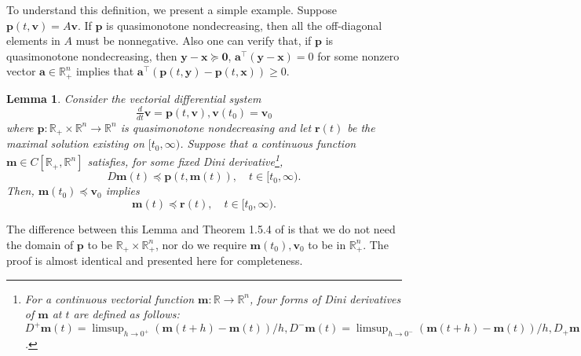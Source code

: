 \documentclass[letterpaper, 10 pt, journal, twoside]{IEEEtran}
\theoremstyle{plain}
\newtheorem{lemma}{Lemma}
\newcommand{\myvar}[1]{\bm{#1}}
\begin{document}
To {understand} this definition, we present a simple example. {Suppose} $ \myvar{p}(t, \myvar{v}) = A\myvar{v} $. {If} $ \myvar{p} $ {is} quasimonotone nondecreasing, {then} all the off-diagonal elements in $ A $ {must be} nonnegative. {Also} one {can} verify that, if $ \myvar{p} $ is quasimonotone nondecreasing, then  $ \myvar{y} - \myvar{x} \succeq \myvar{0}$, $ \myvar{a}^\top (\myvar{y}-\myvar{x}) = 0 $ for some nonzero vector $ \myvar{a} \in \mathbb{R}^n_{+} $ implies that $ \myvar{a}^\top (\myvar{p}(t,\myvar{y})- \myvar{p}(t,\myvar{x})) \ge 0 $.

\begin{lemma}\cite[Modified from Theorem~1.5.4]{lakshmikantham1989stability} \label{lem:generalized comparison lemma}
	Consider the vectorial differential system 
	\begin{equation}\label{eq:general_sys}
	\tfrac{d}{dt}\myvar{v} = \myvar{p}(t,\myvar{v}), \myvar{v}(t_0) = \myvar{v}_0
	\end{equation}
	where $ \myvar{p}: \mathbb{R}_{+}  \times \mathbb{R}^n \to \mathbb{R}^n $ is quasimonotone nondecreasing and let $ \myvar{r}(t) $ be the maximal solution existing on $ [t_0, \infty) $. Suppose that a continuous function $ \myvar{m}\in C[\mathbb{R}_{+}, \mathbb{R}^n] $ satisfies, for some fixed Dini derivative\footnote{ For a continuous vectorial function $\myvar{m}:\mathbb{R}\to \mathbb{R}^n$, four forms of Dini derivatives of $\myvar{m}$ at $t$  are defined as follows: $D^{+}\myvar{m}(t) = \limsup_{h \to 0^{+}} ( \myvar{m}(t+h) - \myvar{m}(t))/h, D^{-}\myvar{m}(t) = \limsup_{h \to 0^{-}} (\myvar{m}(t+h) - \myvar{m}(t))/h, D_{+}\myvar{m}(t) = \liminf_{h \to 0^{+}} (\myvar{m}(t+h) - \myvar{m}(t))/h,  D_{-}\myvar{m}(t) = \liminf_{h \to 0^{-}} ( \myvar{m}(t+h) - \myvar{m}(t))/h $.   },
	\begin{equation}\label{eq:vectorial_diff_inequality}
	D\myvar{m}(t) \preceq \myvar{p}(t,\myvar{m}(t)), \quad  t\in [t_0, \infty) .
	\end{equation}
	Then, $ \myvar{m}(t_0) \preceq \myvar{v}_0 $ implies 
	\begin{equation}
	\myvar{m}(t) \preceq \myvar{r}(t), \quad  t\in [t_0, \infty) .
	\end{equation}
\end{lemma}
 
  The difference between this Lemma and Theorem 1.5.4 {of} \cite{lakshmikantham1989stability} is that we do not need the domain of $ \myvar{p} $ to be $ \mathbb{R}_{+} \times \mathbb{R}^n_{+} $, nor {do we require} $\myvar{m}(t_0), \myvar{v}_0 $ to be in $  \mathbb{R}^n_{+} $. The proof is almost identical and presented here for completeness.
  
\end{document}
